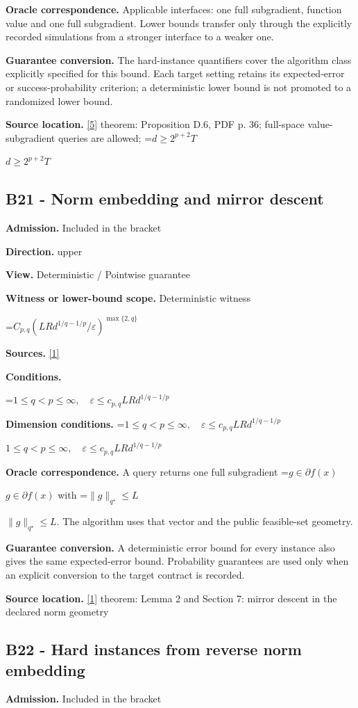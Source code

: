 \documentclass[10pt,a4paper]{article}
\newcommand{\AtlasMath}[1]{\par\begingroup\centering\setbox0=\hbox{$\displaystyle #1$}\ifdim\wd0>1.4\linewidth\typeout{ATLAS WIDE FORMULA: \the\wd0}\fi\ifdim\wd0>\linewidth\resizebox{\linewidth}{!}{\box0}\else\box0\fi\par\endgroup}
\newcommand{\AtlasInlineMath}[1]{\begingroup\setbox0=\hbox{$#1$}\ifdim\wd0>.4\linewidth\endgroup\AtlasMath{#1}\else\endgroup$#1$\fi}
\begin{document}
\textbf{Oracle correspondence.} Applicable interfaces: one full subgradient, function value and one full subgradient. Lower bounds transfer only through the explicitly recorded simulations from a stronger interface to a weaker one.

\textbf{Guarantee conversion.} The hard-instance quantifiers cover the algorithm class explicitly specified for this bound. Each target setting retains its expected-error or success-probability criterion; a deterministic lower bound is not promoted to a randomized lower bound.

\textbf{Source location.} \href{https://arxiv.org/pdf/2609.32910}{[5]} theorem: Proposition D.6, PDF p. 36; full-space value-subgradient queries are allowed; \AtlasInlineMath{d\ge2^{p+2}T}

\subsection{B21 - Norm embedding and mirror descent}
\textbf{Admission.} Included in the bracket

\textbf{Direction.} upper

\textbf{View.} Deterministic / Pointwise guarantee

\textbf{Witness or lower-bound scope.} Deterministic witness

\AtlasMath{C_{p,q}(LRd^{1/q-1/p}/\varepsilon)^{\max\{2,q\}}}
\textbf{Sources.} \href{https://arxiv.org/pdf/1107.4080}{[1]}

\textbf{Conditions.} 
\AtlasMath{1\le q<p\le\infty,\quad\varepsilon\le c_{p,q}LRd^{1/q-1/p}}


\textbf{Dimension conditions.} \AtlasInlineMath{1\le q<p\le\infty,\quad\varepsilon\le c_{p,q}LRd^{1/q-1/p}}

\textbf{Oracle correspondence.} A query returns one full subgradient \AtlasInlineMath{g\in\partial f(x)} with \AtlasInlineMath{\|g\|_{q^\star}\le L}. The algorithm uses that vector and the public feasible-set geometry.

\textbf{Guarantee conversion.} A deterministic error bound for every instance also gives the same expected-error bound. Probability guarantees are used only when an explicit conversion to the target contract is recorded.

\textbf{Source location.} \href{https://arxiv.org/pdf/1107.4080}{[1]} theorem: Lemma 2 and Section 7: mirror descent in the declared norm geometry

\subsection{B22 - Hard instances from reverse norm embedding}
\textbf{Admission.} Included in the bracket
\end{document}
